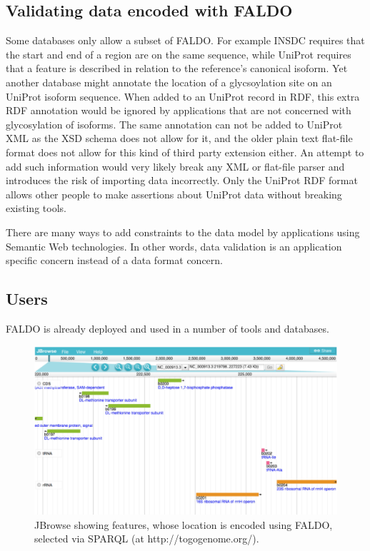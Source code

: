 \subsection*{Validating data encoded with FALDO}

Some databases only allow a subset of FALDO. 
For example INSDC requires that the start and end of a region are on the same sequence,
while UniProt requires that a feature is described in relation to the reference's canonical isoform.
Yet another database might annotate the location of a glycsoylation site on an UniProt isoform sequence.
When added to an UniProt record in RDF, this extra RDF annotation would be ignored by applications that are not concerned with glycosylation of isoforms.
The same annotation can not be added to UniProt XML as the XSD schema does not allow for it,
and the older plain text flat-file format does not allow for this kind of third party extension either.
An attempt to add such information would very likely break any XML or flat-file parser and introduces the risk of importing data incorrectly.
Only the UniProt RDF format allows other people to make assertions about UniProt data without breaking existing tools.

There are many ways to add constraints to the data model by applications using Semantic Web technologies\cite{RDFValidationReport}.
In other words, data validation is an application specific concern instead of a data format concern.

\subsection*{Users}
FALDO is already deployed and used in a number of tools and databases.


\begin{figure}
\begin{center}
\includegraphics[width=16cm]{figures/togogenomes.pdf}
\end{center}
\caption{JBrowse showing features, whose location is encoded using FALDO, selected via SPARQL (at http://togogenome.org/). }
\label{fig:jbrowse}
\end{figure}

